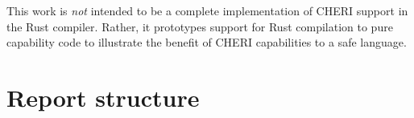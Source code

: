 \documentclass[dissertation.tex]{subfiles}
\begin{document}
This work is \emph{not} intended to be a complete implementation of
CHERI support in the Rust compiler.
Rather, it prototypes support for Rust compilation to pure capability
 code to illustrate the benefit of CHERI
capabilities to a safe language.


\section{Report structure}
\todo{}
\end{document}
